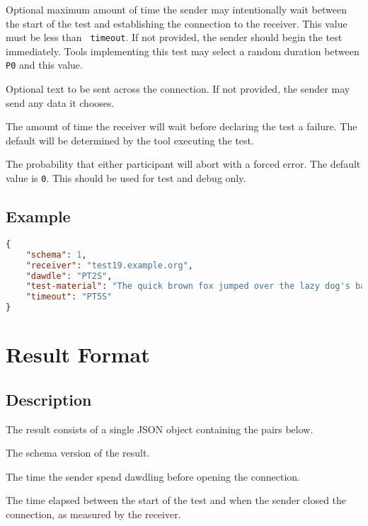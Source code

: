 \documentclass[10pt]{article}
\begin{document}
 Optional maximum amount of time the sender
may intentionally wait between the start of the test and establishing
the connection to the receiver.  This value must be less than {\tt
timeout}.  If not provided, the sender should begin the test
immediately.  Tools implementing this test may select a random
duration between {\tt P0} and this value.

 Optional text to be sent across the
connection.  If not provided, the sender may send any data it chooses.

 The amount of time the receiver will wait
before declaring the test a failure.  The default will be determined
by the tool executing the test.

 The probability that either participant
will abort with a forced error.  The default value is {\tt 0}.  This
should be used for test and debug only.


\subsection{Example}
\begin{lstlisting}[language=json]
{
    "schema": 1,
    "receiver": "test19.example.org",
    "dawdle": "PT2S",
    "test-material": "The quick brown fox jumped over the lazy dog's back.",
    "timeout": "PT5S" 
}
\end{lstlisting}



%
%

\section{Result Format}

\subsection{Description}
The result consists of a single JSON object containing the pairs
below.  \seejson

 The schema version of the result.

 The time the sender spend dawdling
before opening the connection.

 The time elapsed between the start
of the test and when the sender closed the connection, as measured by
the receiver.
\end{document}
